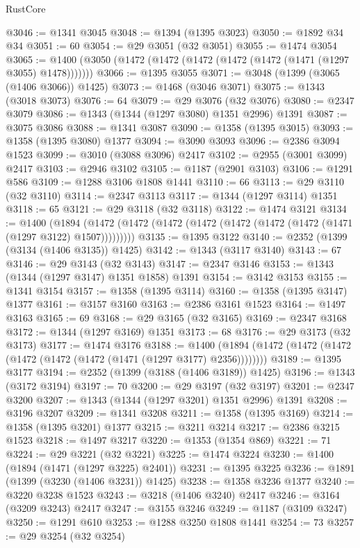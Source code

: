 \begin{lexlean}{RustCore}
\begin{coremodule}
@3046 := @1341 @3045
@3048 := @1394 (@1395 @3023)
@3050 := @1892 @34 @34
@3051 := 60
@3054 := @29 @3051 (@32 @3051)
@3055 := @1474 @3054
@3065 := @1400 (@3050 (@1472 (@1472 (@1472 (@1472 (@1472 (@1471 (@1297 @3055) @1478)))))))
@3066 := @1395 @3055
@3071 := @3048 (@1399 (@3065 (@1406 @3066)) @1425)
@3073 := @1468 (@3046 @3071)
@3075 := @1343 (@3018 @3073)
@3076 := 64
@3079 := @29 @3076 (@32 @3076)
@3080 := @2347 @3079
@3086 := @1343 (@1344 (@1297 @3080) @1351 @2996) @1391
@3087 := @3075 @3086
@3088 := @1341 @3087
@3090 := @1358 (@1395 @3015)
@3093 := @1358 (@1395 @3080) @1377
@3094 := @3090 @3093
@3096 := @2386 @3094 @1523
@3099 := @3010 (@3088 @3096) @2417
@3102 := @2955 (@3001 @3099) @2417
@3103 := @2946 @3102
@3105 := @1187 (@2901 @3103)
@3106 := @1291 @586
@3109 := @1288 @3106 @1808 @1441
@3110 := 66
@3113 := @29 @3110 (@32 @3110)
@3114 := @2347 @3113
@3117 := @1344 (@1297 @3114) @1351
@3118 := 65
@3121 := @29 @3118 (@32 @3118)
@3122 := @1474 @3121
@3134 := @1400
    (@1894 (@1472 (@1472 (@1472 (@1472 (@1472 (@1472 (@1472 (@1471 (@1297 @3122) @1507)))))))))
@3135 := @1395 @3122
@3140 := @2352 (@1399 (@3134 (@1406 @3135)) @1425)
@3142 := @1343 (@3117 @3140)
@3143 := 67
@3146 := @29 @3143 (@32 @3143)
@3147 := @2347 @3146
@3153 := @1343 (@1344 (@1297 @3147) @1351 @1858) @1391
@3154 := @3142 @3153
@3155 := @1341 @3154
@3157 := @1358 (@1395 @3114)
@3160 := @1358 (@1395 @3147) @1377
@3161 := @3157 @3160
@3163 := @2386 @3161 @1523
@3164 := @1497 @3163
@3165 := 69
@3168 := @29 @3165 (@32 @3165)
@3169 := @2347 @3168
@3172 := @1344 (@1297 @3169) @1351
@3173 := 68
@3176 := @29 @3173 (@32 @3173)
@3177 := @1474 @3176
@3188 := @1400 (@1894 (@1472 (@1472 (@1472 (@1472 (@1472 (@1472 (@1471 (@1297 @3177) @2356))))))))
@3189 := @1395 @3177
@3194 := @2352 (@1399 (@3188 (@1406 @3189)) @1425)
@3196 := @1343 (@3172 @3194)
@3197 := 70
@3200 := @29 @3197 (@32 @3197)
@3201 := @2347 @3200
@3207 := @1343 (@1344 (@1297 @3201) @1351 @2996) @1391
@3208 := @3196 @3207
@3209 := @1341 @3208
@3211 := @1358 (@1395 @3169)
@3214 := @1358 (@1395 @3201) @1377
@3215 := @3211 @3214
@3217 := @2386 @3215 @1523
@3218 := @1497 @3217
@3220 := @1353 (@1354 @869)
@3221 := 71
@3224 := @29 @3221 (@32 @3221)
@3225 := @1474 @3224
@3230 := @1400 (@1894 (@1471 (@1297 @3225) @2401))
@3231 := @1395 @3225
@3236 := @1891 (@1399 (@3230 (@1406 @3231)) @1425)
@3238 := @1358 @3236 @1377
@3240 := @3220 @3238 @1523
@3243 := @3218 (@1406 @3240) @2417
@3246 := @3164 (@3209 @3243) @2417
@3247 := @3155 @3246
@3249 := @1187 (@3109 @3247)
@3250 := @1291 @610
@3253 := @1288 @3250 @1808 @1441
@3254 := 73
@3257 := @29 @3254 (@32 @3254)

\end{coremodule}
\end{lexlean}
